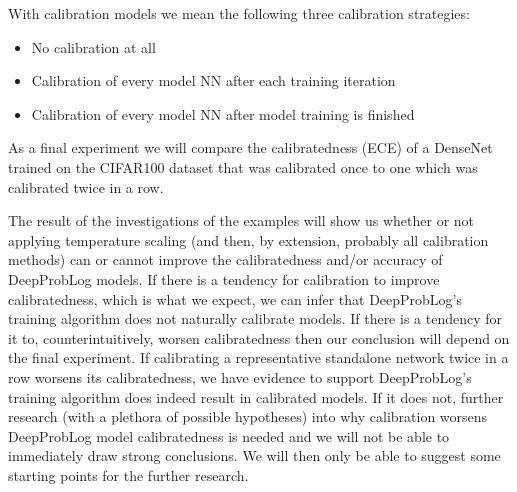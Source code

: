 With calibration models we mean the following three calibration strategies:
\begin{itemize}
  \item No calibration at all
  \item Calibration of every model NN after each training iteration
  \item Calibration of every model NN after model training is finished
\end{itemize}\par
As a final experiment we will compare the calibratedness (ECE) of a DenseNet trained on the CIFAR100 dataset that was calibrated once to one which was calibrated twice in a row.\par
The result of the investigations of the examples will show us whether or not applying temperature scaling (and then, by extension, probably all calibration methods) can or cannot improve the calibratedness and/or accuracy of DeepProbLog models. If there is a tendency for calibration to improve calibratedness, which is what we expect, we can infer that DeepProbLog's training algorithm does not naturally calibrate models. If there is a tendency for it to, counterintuitively, worsen calibratedness then our conclusion will depend on the final experiment. If calibrating a representative standalone network twice in a row worsens its calibratedness, we have evidence to support DeepProbLog's training algorithm does indeed result in calibrated models. If it does not, further research (with a plethora of possible hypotheses) into why calibration worsens DeepProbLog model calibratedness is needed and we will not be able to immediately draw strong conclusions. We will then only be able to suggest some starting points for the further research.

